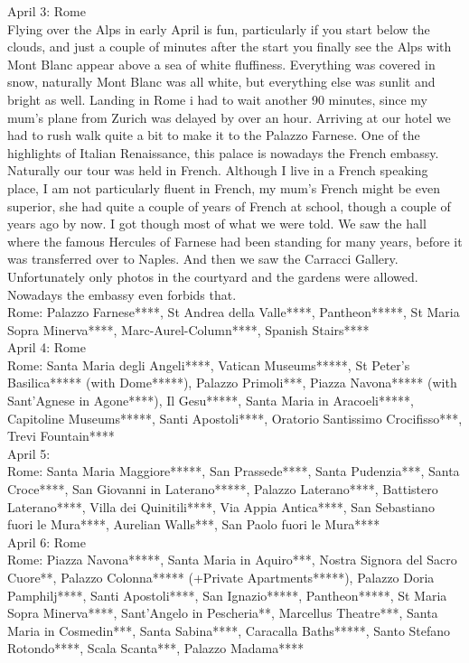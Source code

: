 April 3: Rome\\
Flying over the Alps in early April is fun, particularly if you start below the clouds, and just a couple of minutes after the start you finally see the Alps with Mont Blanc appear above a sea of white fluffiness. Everything was covered in snow, naturally Mont Blanc was all white, but everything else was sunlit and bright as well. Landing in Rome i had to wait another 90 minutes, since my mum's plane from Zurich was delayed by over an hour. Arriving at our hotel we had to rush walk quite a bit to make it to the Palazzo Farnese. One of the highlights of Italian Renaissance, this palace is nowadays the French embassy. Naturally our tour was held in French. Although I live in a French speaking place, I am not particularly fluent in French, my mum's French might be even superior, she had quite a couple of years of French at school, though a couple of years ago by now. I got though most of what we were told. We saw the hall where the famous Hercules of Farnese had been standing for many years, before it was transferred over to Naples. And then we saw the Carracci Gallery. Unfortunately only photos in the courtyard and the gardens were allowed. Nowadays the embassy even forbids that.\\

Rome: Palazzo Farnese****, St Andrea della Valle****, Pantheon*****, St Maria Sopra Minerva****, Marc-Aurel-Column****, Spanish Stairs****\\

April 4: Rome\\
Rome: Santa Maria degli Angeli****, Vatican Museums*****, St Peter's Basilica***** (with Dome*****), Palazzo Primoli***, Piazza Navona***** (with Sant'Agnese in Agone****), Il Gesu*****, Santa Maria in Aracoeli*****, Capitoline Museums*****, Santi Apostoli****, Oratorio Santissimo Crocifisso***, Trevi Fountain****\\

April 5:\\
Rome: Santa Maria Maggiore*****, San Prassede****, Santa Pudenzia***, Santa Croce****, San Giovanni in Laterano*****, Palazzo Laterano****, Battistero Laterano****, Villa dei Quinitili****, Via Appia Antica****, San Sebastiano fuori le Mura****, Aurelian Walls***, San Paolo fuori le Mura****\\

April 6: Rome\\
Rome: Piazza Navona*****, Santa Maria in Aquiro***, Nostra Signora del Sacro Cuore**, Palazzo Colonna***** (+Private Apartments*****), Palazzo Doria Pamphilj****, Santi Apostoli****, San Ignazio*****, Pantheon*****, St Maria Sopra Minerva****, Sant'Angelo in Pescheria**, Marcellus Theatre***, Santa Maria in Cosmedin***, Santa Sabina****, Caracalla Baths*****, Santo Stefano Rotondo****, Scala Scanta***, Palazzo Madama****\\

